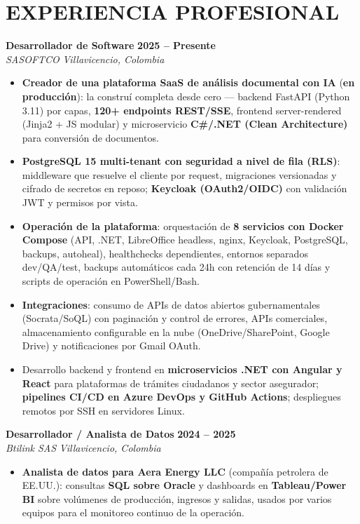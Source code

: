 \documentclass[letterpaper,10pt]{article}
\begin{document}
\section{EXPERIENCIA PROFESIONAL}

\textbf{Desarrollador de Software} \hfill \textbf{2025 -- Presente} \\
\textit{SASOFTCO} \hfill \textit{Villavicencio, Colombia}
\begin{itemize}
    \item \textbf{Creador de una plataforma SaaS de análisis documental con IA} (\textbf{en producción}): la construí completa desde cero — backend FastAPI (Python 3.11) por capas, \textbf{120+ endpoints REST/SSE}, frontend server-rendered (Jinja2 + JS modular) y microservicio \textbf{C\#/.NET (Clean Architecture)} para conversión de documentos.
    \item \textbf{PostgreSQL 15 multi-tenant con seguridad a nivel de fila (RLS)}: middleware que resuelve el cliente por request, migraciones versionadas y cifrado de secretos en reposo; \textbf{Keycloak (OAuth2/OIDC)} con validación JWT y permisos por vista.
    \item \textbf{Operación de la plataforma}: orquestación de \textbf{8 servicios con Docker Compose} (API, .NET, LibreOffice headless, nginx, Keycloak, PostgreSQL, backups, autoheal), healthchecks dependientes, entornos separados dev/QA/test, backups automáticos cada 24h con retención de 14 días y scripts de operación en PowerShell/Bash.
    \item \textbf{Integraciones}: consumo de APIs de datos abiertos gubernamentales (Socrata/SoQL) con paginación y control de errores, APIs comerciales, almacenamiento configurable en la nube (OneDrive/SharePoint, Google Drive) y notificaciones por Gmail OAuth.
    \item Desarrollo backend y frontend en \textbf{microservicios .NET con Angular y React} para plataformas de trámites ciudadanos y sector asegurador; \textbf{pipelines CI/CD en Azure DevOps y GitHub Actions}; despliegues remotos por SSH en servidores Linux.
\end{itemize}

\textbf{Desarrollador / Analista de Datos} \hfill \textbf{2024 -- 2025} \\
\textit{Btilink SAS} \hfill \textit{Villavicencio, Colombia}
\begin{itemize}
    \item \textbf{Analista de datos para Aera Energy LLC} (compañía petrolera de EE.UU.): consultas \textbf{SQL sobre Oracle} y dashboards en \textbf{Tableau/Power BI} sobre volúmenes de producción, ingresos y salidas, usados por varios equipos para el monitoreo continuo de la operación.
\end{itemize}
\end{document}
